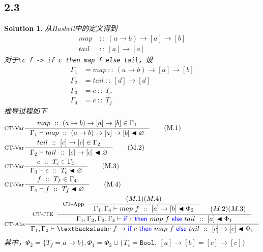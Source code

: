 \documentclass[11pt, a4paper]{article}
\newtheorem{Solution}{Solution}
\let\t\texttt
\let\emptyset\varnothing
\newcommand{\Bool}{\t{Bool}}
\newcommand{\kword}[1]{{\color{blue} \textsf{#1}}}
\newcommand{\If}{\kword{if}}
\newcommand{\Then}{\kword{then}}
\newcommand{\Else}{\kword{else}}
\begin{document}
    \subsection*{2.3}
    \begin{Solution}
        从Haskell中的定义得到
        \begin{align*}
            map~&::~(a\rightarrow b)\rightarrow [a]\rightarrow [b] \\
            tail~&::~[a]\rightarrow [a]
        \end{align*}
        对于\t{\textbackslash c f -> if c then map f else tail}，设
        \begin{align*}
            \Gamma_1 &= map~::~(a\rightarrow b)\rightarrow [a]\rightarrow [b] \\
            \Gamma_2 &= tail~::~[d]\rightarrow [d] \\
            \Gamma_3 &= c~::~T_c \\
            \Gamma_4 &= c~::~T_f
        \end{align*}
        推导过程如下
        \begin{align}
            &\inference[CT-Var]{map~::~(a\rightarrow b)\rightarrow [a] \rightarrow [b] \in \Gamma_1}{\Gamma_1 \vdash map~::~(a\rightarrow b)\rightarrow [a]\rightarrow [b] \blacktriangleleft \emptyset} \tag{M.1} \\
            &\inference[CT-Var]{tail~::~[c]\rightarrow [c] \in \Gamma_2}{\Gamma_2 \vdash tail~::~[c]\rightarrow [c] \blacktriangleleft \emptyset} \tag{M.2} \\
            &\inference[CT-Var]{c~::~T_c \in \Gamma_3}{\Gamma_3 \vdash c~::~T_c \blacktriangleleft \emptyset} \tag{M.3} \\
            &\inference[CT-Var]{f~::~T_f \in \Gamma_4}{\Gamma_4 \vdash f~::~T_f \blacktriangleleft \emptyset} \tag{M.4} \\
            &\inference[CT-Abs]{\inference[CT-ITE]{\inference[CT-App]{(M.1)(M.4)}{\Gamma_1, \Gamma_4 \vdash map~f~::~[a]\rightarrow [b] \blacktriangleleft \Phi_2} & (M.2)(M.3)}{\Gamma_1, \Gamma_2, \Gamma_3, \Gamma_4 \vdash \If~c~\Then~map~f~\Else~tail~::~[a] \blacktriangleleft \Phi_1}}{\Gamma_1, \Gamma_2 \vdash \textbackslash c~f\rightarrow \If~c~\Then~map~f~\Else~tail~::~[c]\rightarrow [c] \blacktriangleleft \Phi_1} \notag
        \end{align}
        其中，$\Phi_2=\{T_f=a\rightarrow b\},\Phi_1=\Phi_2\cup \{T_c=\Bool,~[a]\rightarrow [b]=[c] \rightarrow [c]\}$
    \end{Solution}
\end{document}
